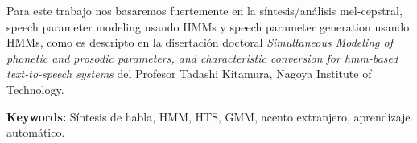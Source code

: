 \noindent Para este trabajo nos basaremos fuertemente en la síntesis/análisis mel-cepstral, speech parameter modeling usando HMMs y speech parameter generation usando HMMs, como es descripto en la disertación doctoral \textit{Simultaneous Modeling of phonetic and prosodic parameters, and characteristic conversion for hmm-based text-to-speech systems} del Profesor Tadashi Kitamura, Nagoya Institute of Technology\cite{phoneticAndProsodic}.

\bigskip

\noindent\textbf{Keywords:} Síntesis de habla, HMM, HTS, GMM, acento extranjero, aprendizaje automático.
